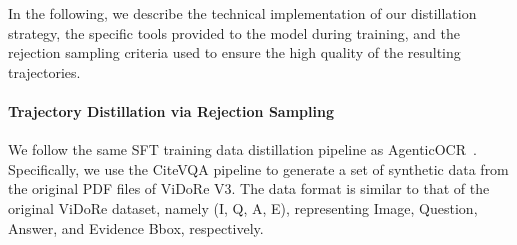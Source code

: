\documentclass{llmxive}
\begin{document}
{{{\begin{table}[htbp]
\centering
\footnotesize
{}
\label{tab:retrieval_results}
\caption{Performance comparison on FinRAGBench-V~\citep{zhao-etal-2025-finragbench} (subset with bounding boxes) and the held-out test set of ViDoRe V3.
$\mathbf{Page_{acc}}$ measures page-level judgment ability; $\mathbf{Recall_{min}}$ indicates coarse-grained localization;
$\mathbf{Recall_{EM}}$ reflects exact-grained localization. On FinRAGBench-V, CiteVQA Pipeline (3k) achieves comparable or
slightly better performance than Vidore Original (5k). On ViDoRe V3, Vidore Original shows a slight advantage.
}
\end{table}

In the following, we describe the technical implementation of our distillation strategy, the specific tools provided to the model during training, and the rejection sampling criteria used to ensure the high quality of the resulting trajectories.

\paragraph{Trajectory Distillation via Rejection Sampling} We follow the same SFT training data distillation pipeline as AgenticOCR~\citep{wang2026agenticocr}. Specifically, we use the CiteVQA pipeline to generate a set of synthetic data from the original PDF files of ViDoRe V3. The data format is similar to that of the original ViDoRe dataset, namely (I, Q, A, E), representing Image, Question, Answer, and Evidence Bbox, respectively.

}}}
\end{document}
